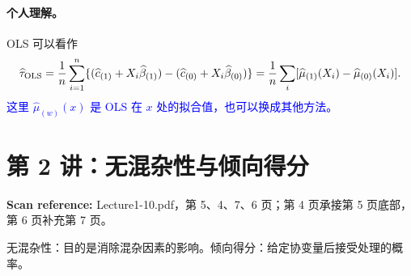 \documentclass[11pt,a4paper]{article}
\newcommand{\sourcepages}[1]{\par{\small\sffamily\color{muted}\textbf{Scan reference:} #1\par}\nobreak\smallskip\nopagebreak[4]}
\newcommand{\inkblue}[1]{\textcolor{blue}{#1}}
\begin{document}
\paragraph{个人理解。}
OLS 可以看作
\[
\widehat\tau_{\rm OLS}=\frac1n\sum_{i=1}^n
\{(\widehat c_{(1)}+X_i\widehat\beta_{(1)})
 -(\widehat c_{(0)}+X_i\widehat\beta_{(0)})\}
=\frac1n\sum_i[\widehat\mu_{(1)}(X_i)-\widehat\mu_{(0)}(X_i)].
\]
\inkblue{这里 $\widehat\mu_{(w)}(x)$ 是 OLS 在 $x$ 处的拟合值，也可以换成其他方法。}

\section{第 2 讲：无混杂性与倾向得分}
\sourcepages{Lecture1-10.pdf，第 5、4、7、6 页；第 4 页承接第 5 页底部，第 6 页补充第 7 页。}
无混杂性：目的是消除混杂因素的影响。倾向得分：给定协变量后接受处理的概率。
\end{document}
